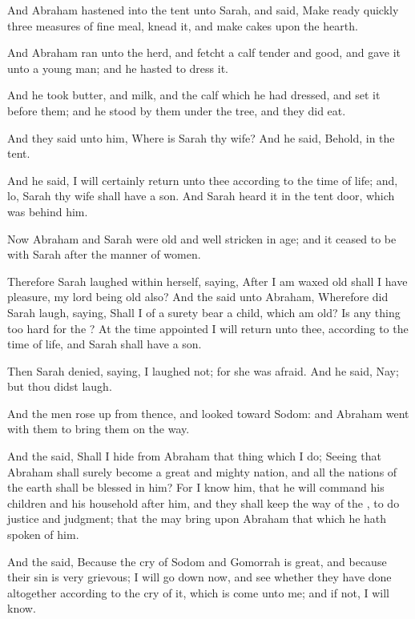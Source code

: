 \Verse And Abraham hastened into the tent unto Sarah, and said, Make ready quickly three measures of fine meal, knead it, and make cakes upon the hearth.

\Verse And Abraham ran unto the herd, and fetcht a calf tender and good, and gave it unto a young man; and he hasted to dress it.

\Verse And he took butter, and milk, and the calf which he had dressed, and set it before them; and he stood by them under the tree, and they did eat.

\Verse And they said unto him, Where is Sarah thy wife? And he said, Behold, in the tent.

\Verse And he said, I will certainly return unto thee according to the time of life; and, lo, Sarah thy wife shall have a son. And Sarah heard it in the tent door, which was behind him.

\Verse Now Abraham and Sarah were old and well stricken in age; and it ceased to be with Sarah after the manner of women.

\Verse Therefore Sarah laughed within herself, saying, After I am waxed old shall I have pleasure, my lord being old also?  \Verse And the \LORD said unto Abraham, Wherefore did Sarah laugh, saying, Shall I of a surety bear a child, which am old?  \Verse Is any thing too hard for the \LORD? At the time appointed I will return unto thee, according to the time of life, and Sarah shall have a son.

\Verse Then Sarah denied, saying, I laughed not; for she was afraid.  And he said, Nay; but thou didst laugh.

\Verse And the men rose up from thence, and looked toward Sodom: and Abraham went with them to bring them on the way.

\Verse And the \LORD said, Shall I hide from Abraham that thing which I do; \Verse Seeing that Abraham shall surely become a great and mighty nation, and all the nations of the earth shall be blessed in him?  \Verse For I know him, that he will command his children and his household after him, and they shall keep the way of the \LORD, to do justice and judgment; that the \LORD may bring upon Abraham that which he hath spoken of him.

\Verse And the \LORD said, Because the cry of Sodom and Gomorrah is great, and because their sin is very grievous; \Verse I will go down now, and see whether they have done altogether according to the cry of it, which is come unto me; and if not, I will know.

